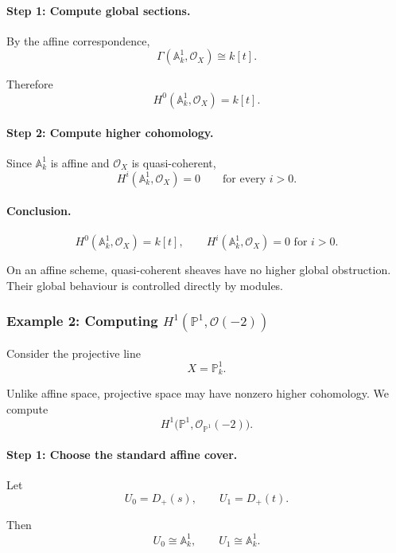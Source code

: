\documentclass[12pt,a4paper]{article}
\theoremstyle{notespace}
\begin{document}
\paragraph{Step 1: Compute global sections.}

By the affine correspondence,
\[
\Gamma(\mathbb{A}^{1}_{k},\mathcal{O}_{X})
\cong
k[t].
\]

Therefore
\[
H^{0}(\mathbb{A}^{1}_{k},\mathcal{O}_{X})
=
k[t].
\]

\paragraph{Step 2: Compute higher cohomology.}

Since \(\mathbb{A}^{1}_{k}\) is affine and \(\mathcal{O}_{X}\) is
quasi-coherent,
\[
H^{i}(\mathbb{A}^{1}_{k},\mathcal{O}_{X})
=
0
\qquad
\text{for every }i>0.
\]

\paragraph{Conclusion.}

\[
\boxed{
	H^{0}(\mathbb{A}^{1}_{k},\mathcal{O}_{X})=k[t],
	\qquad
	H^{i}(\mathbb{A}^{1}_{k},\mathcal{O}_{X})=0
	\text{ for }i>0.
}
\]

On an affine scheme, quasi-coherent sheaves have no higher global
obstruction. Their global behaviour is controlled directly by modules.

\subsubsection{Example 2: Computing \texorpdfstring{\(H^{1}(\mathbb{P}^{1},\mathcal{O}(-2))\)}{H1(P1,O(-2))}}

Consider the projective line
\[
X=\mathbb{P}^{1}_{k}.
\]

Unlike affine space, projective space may have nonzero higher cohomology.
We compute
\[
H^{1}\bigl(\mathbb{P}^{1},\mathcal{O}_{\mathbb{P}^{1}}(-2)\bigr).
\]

\paragraph{Step 1: Choose the standard affine cover.}

Let
\[
U_{0}=D_{+}(s),
\qquad
U_{1}=D_{+}(t).
\]

Then
\[
U_{0}\cong \mathbb{A}^{1}_{k},
\qquad
U_{1}\cong \mathbb{A}^{1}_{k}.
\]
\end{document}
